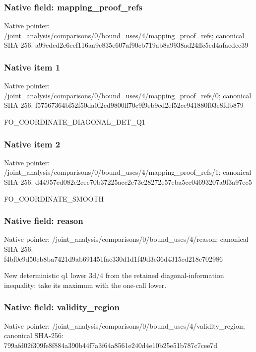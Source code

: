 \documentclass[10pt,a4paper]{article}
\begin{document}
\subsubsection{Native field: mapping\_\allowbreak{}proof\_\allowbreak{}refs}
Native pointer: /joint\_\allowbreak{}analysis/comparisons/0/bound\_\allowbreak{}uses/4/mapping\_\allowbreak{}proof\_\allowbreak{}refs; canonical SHA-256: a99edcd2c6ccf116aa9c835e607af90cb719ab8a9938ad24ffc5cd4afaedcc39

\subsubsection{Native item 1}
Native pointer: /joint\_\allowbreak{}analysis/comparisons/0/bound\_\allowbreak{}uses/4/mapping\_\allowbreak{}proof\_\allowbreak{}refs/0; canonical SHA-256: f57567364bf52f50da0f2cd9800ff70c9f9eb9cd2ef52ce941880f03e8fdb879

\begingroup\raggedright\sloppy FO\_\allowbreak{}COORDINATE\_\allowbreak{}DIAGONAL\_\allowbreak{}DET\_\allowbreak{}Q1\par\endgroup

\subsubsection{Native item 2}
Native pointer: /joint\_\allowbreak{}analysis/comparisons/0/bound\_\allowbreak{}uses/4/mapping\_\allowbreak{}proof\_\allowbreak{}refs/1; canonical SHA-256: d44957cd082e2cec70b37225acc2e73e28272e57eba5ce04693207a9f3a97ec5

\begingroup\raggedright\sloppy FO\_\allowbreak{}COORDINATE\_\allowbreak{}SMOOTH\par\endgroup

\subsubsection{Native field: reason}
Native pointer: /joint\_\allowbreak{}analysis/comparisons/0/bound\_\allowbreak{}uses/4/reason; canonical SHA-256: f4bf0c9d50cb8ba7421d9ab691451fac330d1d1f49d3e36d4315ed218c702986

\begingroup\raggedright\sloppy New deterministic q1 lower 3d/\allowbreak{}4 from the retained diagonal-information inequality;\allowbreak{} take its maximum with the one-call lower.\par\endgroup

\subsubsection{Native field: validity\_\allowbreak{}region}
Native pointer: /joint\_\allowbreak{}analysis/comparisons/0/bound\_\allowbreak{}uses/4/validity\_\allowbreak{}region; canonical SHA-256: 799afd02f309fe8f884a390b44f7a3f64a8561e240d4e10b25e51b787c7cee7d
\end{document}
